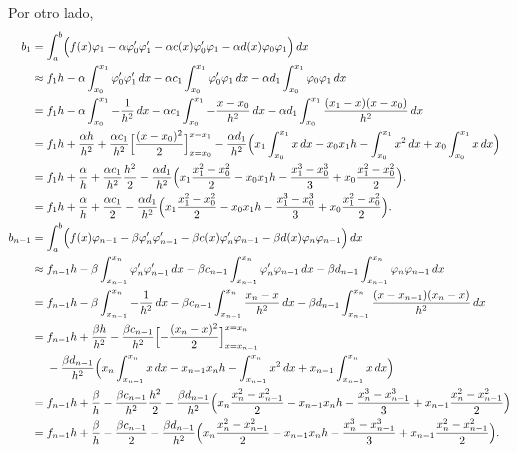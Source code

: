 \documentclass[a4paper, 10pt, oneside]{report}
\begin{document}
Por otro lado,
\begin{align*}
    b_1 &= \int_a^b\Bigl(f(x)\varphi_1-\alpha\varphi_0'\varphi_1'-\alpha c(x)\varphi_0'\varphi_1-\alpha d(x)\varphi_0\varphi_1\Bigr)\, dx \\
    &\approx f_1h-\alpha\int_{x_0}^{x_1}\varphi_0'\varphi_1'\, dx -\alpha c_1\int_{x_0}^{x_1}\varphi_0'\varphi_1 \, dx - \alpha d_1 \int_{x_0}^{x_1}\varphi_0\varphi_1\, dx \\
    &= f_1h-\alpha\int_{x_0}^{x_1}-\frac{1}{h^2} \, dx -\alpha c_1 \int_{x_0}^{x_1}-\frac{x-x_0}{h^2} \, dx -\alpha d_1 \int_{x_0}^{x_1} \frac{(x_1-x)(x-x_0)}{h^2}\, dx \\
    &= f_1h+\frac{\alpha h}{h^2} +\frac{\alpha c_1}{h^2}\Bigl[\frac{(x-x_0)^2}{2}\Bigr]_{x=x_0}^{x=x_1} -\frac{\alpha d_1}{h^2}\Bigl(x_1\int_{x_0}^{x_1}x\, dx -x_0x_1h-\int_{x_0}^{x_1}x^2\,dx +x_0\int_{x_0}^{x_1}x\, dx\Bigr) \\
    &= f_1h+\frac{\alpha }{h} +\frac{\alpha c_1}{h^2}\frac{h^2}{2} -\frac{\alpha d_1}{h^2}\Bigl(x_1\frac{x_1^2-x_0^2}{2} -x_0x_1h-\frac{x_1^3-x_0^3}{3} +x_0\frac{x_1^2-x_0^2}{2}\Bigr). \\
    &= f_1h+\frac{\alpha }{h} +\frac{\alpha c_1}{2} -\frac{\alpha d_1}{h^2}\Bigl(x_1\frac{x_1^2-x_0^2}{2} -x_0x_1h-\frac{x_1^3-x_0^3}{3} +x_0\frac{x_1^2-x_0^2}{2}\Bigr). \\
    b_{n-1} &= \int_a^b\Bigl(f(x)\varphi_{n-1}-\beta\varphi_n'\varphi_{n-1}'-\beta c(x)\varphi_n'\varphi_{n-1}-\beta d(x)\varphi_n\varphi_{n-1}\Bigr)\, dx\\
    &\approx f_{n-1}h - \beta\int_{x_{n-1}}^{x_n}\varphi_n'\varphi_{n-1}'\, dx - \beta c_{n-1}\int_{x_{n-1}}^{x_n}\varphi_n'\varphi_{n-1}\, dx - \beta d_{n-1} \int_{x_{n-1}}^{x_n}\varphi_n\varphi_{n-1}\, dx \\
    &= f_{n-1}h - \beta\int_{x_{n-1}}^{x_n}-\frac{1}{h^2}\, dx - \beta c_{n-1}\int_{x_{n-1}}^{x_n}\frac{x_{n}-x}{h^2}\, dx - \beta d_{n-1} \int_{x_{n-1}}^{x_n}\frac{(x-x_{n-1})(x_n-x)}{h^2}\, dx \\
    &=  \begin{aligned}[t]
        &f_{n-1}h +\frac{\beta h}{h^2} - \frac{\beta c_{n-1}}{h^2}\Bigl[-\frac{(x_n-x)^2}{2}\Bigr]_{x=x_{n-1}}^{x=x_n} \\
        &- \frac{\beta d_{n-1}}{h^2} \Bigl(x_n\int_{x_{n-1}}^{x_n}x \, dx -x_{n-1}x_n h -\int_{x_{n-1}}^{x_n}x^2 \, dx +x_{n-1}\int_{x_{n-1}}^{x_n}x \, dx\Bigr)
    \end{aligned}\\
    &= f_{n-1}h +\frac{\beta}{h} - \frac{\beta c_{n-1}}{h^2}\frac{h^2}{2}- \frac{\beta d_{n-1}}{h^2} \Bigl(x_n\frac{x_n^2-x_{n-1}^2}{2} -x_{n-1}x_n h -\frac{x_n^3-x_{n-1}^3}{3}+x_{n-1}\frac{x_n^2-x_{n-1}^2}{2}\Bigr) \\
    &= f_{n-1}h +\frac{\beta}{h} - \frac{\beta c_{n-1}}{2}- \frac{\beta d_{n-1}}{h^2} \Bigl(x_n\frac{x_n^2-x_{n-1}^2}{2} -x_{n-1}x_n h -\frac{x_n^3-x_{n-1}^3}{3}+x_{n-1}\frac{x_n^2-x_{n-1}^2}{2}\Bigr).
\end{align*}
\end{document}
